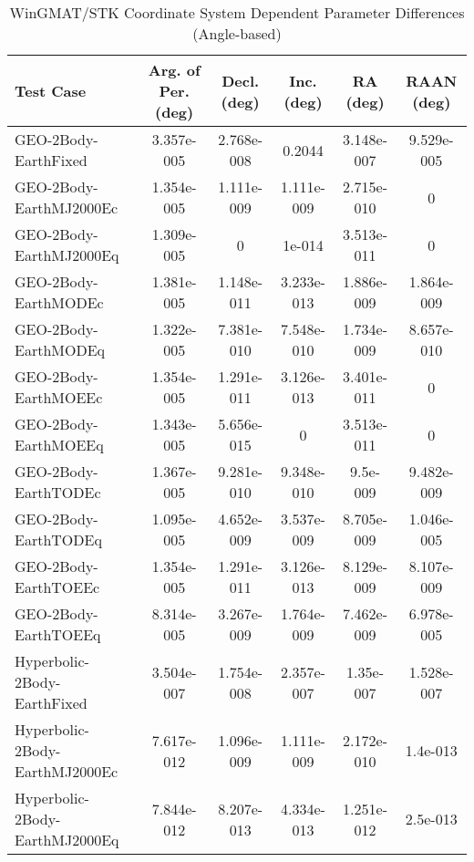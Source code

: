 \begin{table}[htbp!]
\centering
\caption{ WinGMAT/STK Coordinate System Dependent Parameter Differences (Angle-based)}
      \begin{tabular}{lccccc}
      \hline\hline
          Test Case & Arg. of Per. (deg) & Decl. (deg) & Inc. (deg) & RA (deg) & RAAN (deg) \\
         \hline
         GEO-2Body-EarthFixed & 3.357e-005 & 2.768e-008 & 0.2044 & 3.148e-007 & 9.529e-005 \\
         GEO-2Body-EarthMJ2000Ec & 1.354e-005 & 1.111e-009 & 1.111e-009 & 2.715e-010 & 0 \\
         GEO-2Body-EarthMJ2000Eq & 1.309e-005 & 0 & 1e-014 & 3.513e-011 & 0 \\
         GEO-2Body-EarthMODEc & 1.381e-005 & 1.148e-011 & 3.233e-013 & 1.886e-009 & 1.864e-009 \\
         GEO-2Body-EarthMODEq & 1.322e-005 & 7.381e-010 & 7.548e-010 & 1.734e-009 & 8.657e-010 \\
         GEO-2Body-EarthMOEEc & 1.354e-005 & 1.291e-011 & 3.126e-013 & 3.401e-011 & 0 \\
         GEO-2Body-EarthMOEEq & 1.343e-005 & 5.656e-015 & 0 & 3.513e-011 & 0 \\
         GEO-2Body-EarthTODEc & 1.367e-005 & 9.281e-010 & 9.348e-010 & 9.5e-009 & 9.482e-009 \\
         GEO-2Body-EarthTODEq & 1.095e-005 & 4.652e-009 & 3.537e-009 & 8.705e-009 & 1.046e-005 \\
         GEO-2Body-EarthTOEEc & 1.354e-005 & 1.291e-011 & 3.126e-013 & 8.129e-009 & 8.107e-009 \\
         GEO-2Body-EarthTOEEq & 8.314e-005 & 3.267e-009 & 1.764e-009 & 7.462e-009 & 6.978e-005 \\
         Hyperbolic-2Body-EarthFixed & 3.504e-007 & 1.754e-008 & 2.357e-007 & 1.35e-007 & 1.528e-007 \\
         Hyperbolic-2Body-EarthMJ2000Ec & 7.617e-012 & 1.096e-009 & 1.111e-009 & 2.172e-010 & 1.4e-013 \\
         Hyperbolic-2Body-EarthMJ2000Eq & 7.844e-012 & 8.207e-013 & 4.334e-013 & 1.251e-012 & 2.5e-013 \\

\end{tabular}
\end{table}
